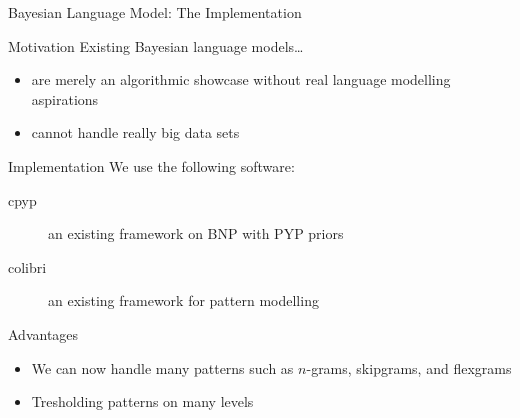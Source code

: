 \begin{frame}{Bayesian Language Model: The Implementation}
    \begin{block}{Motivation}
        Existing Bayesian language models\ldots
        \begin{itemize}
            \item are merely an algorithmic showcase without real language modelling aspirations
            \item cannot handle really big data sets
        \end{itemize}
    \end{block}

    \begin{block}{Implementation}
        We use the following software:
        \begin{description}
            \item[cpyp] an existing \CC{} framework on BNP with PYP priors
            \item[colibri] an existing \CC{} framework for pattern modelling
        \end{description}
    \end{block}

    \begin{block}{Advantages}
        \begin{itemize}
            \item We can now handle many patterns such as $n$-grams, skipgrams, and flexgrams
            \item Tresholding patterns on many levels
        \end{itemize}
    \end{block}
\end{frame}
\note[itemize]{
}

